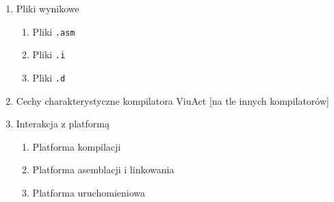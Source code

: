 \documentclass[11pt,oneside,a4paper,twocolumn]{article}
\begin{document}
\begin{enumerate}
\begin{enumerate}
		\item Pliki wynikowe
		\begin{enumerate}
			\item Pliki \texttt{.asm}
			\item Pliki \texttt{.i}
			\item Pliki \texttt{.d}
\end{enumerate}				
		
		\item Cechy charakterystyczne kompilatora ViuAct [na tle innych kompilatorów]
		\item Interakcja z platformą
		\begin{enumerate}
			\item Platforma kompilacji
			\item Platforma asemblacji i linkowania
			\item Platforma uruchomieniowa
		\end{enumerate}
	\end{enumerate}


\end{enumerate}
\end{document}

